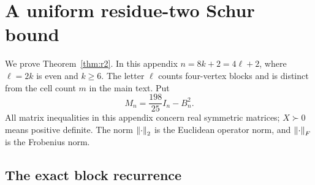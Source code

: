 \section{A uniform residue-two Schur bound}\label{app:r2}

We prove Theorem~\ref{thm:r2}. In this appendix $n=8k+2=4\ell+2$,
where $\ell=2k$ is even and $k\ge6$. The letter $\ell$ counts four-vertex
blocks and is distinct from the cell count $m$ in the main text. Put
\[
 M_n=\frac{198}{25}I_n-B_n^2.
\]
All matrix inequalities in this appendix concern real symmetric matrices;
$X\succ0$ means positive definite. The norm $\left\lVert\cdot\right\rVert_2$ is the
Euclidean operator norm, and $\left\lVert\cdot\right\rVert_F$ is the Frobenius norm.

\subsection{The exact block recurrence}

